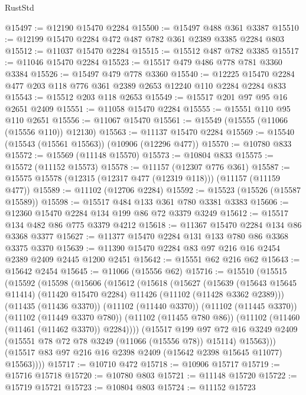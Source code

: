 \begin{lexlean}{RustStd}
\begin{coremodule}
@15497 := @12190 @15470 @2284
@15500 := @15497 @488 @361 @3387
@15510 := @12199 @15470 @2284 @472 @487 @782 @361 @2389 @3385 @2284 @803
@15512 := @11037 @15470 @2284
@15515 := @15512 @487 @782 @3385
@15517 := @11046 @15470 @2284
@15523 := @15517 @479 @486 @778 @781 @3360 @3384
@15526 := @15497 @479 @778 @3360
@15540 := @12225 @15470 @2284 @477 @203 @118 @776 @361 @2389 @2653 @12240 @110 @2284 @2284 @833
@15543 := @15512 @203 @118 @2653
@15549 := @15517 @201 @97 @95 @16 @2651 @2409
@15551 := @11058 @15470 @2284
@15555 := @15551 @110 @95 @110 @2651
@15556 := @11067 @15470
@15561 := @15549 (@15555 (@11066 (@15556 @110)) @12130)
@15563 := @11137 @15470 @2284
@15569 := @15540 (@15543 (@15561 @15563)) (@10906 (@12296 @477))
@15570 := @10780 @833
@15572 := @15569 (@11148 @15570)
@15573 := @10804 @833
@15575 := @15572 (@11152 @15573)
@15578 := @11157 (@12307 @776 @361)
@15587 := @15575 @15578 (@12315 (@12317 @477 (@12319 @118))) (@11157 (@11159 @477))
@15589 := @11102 (@12706 @2284)
@15592 := @15523 (@15526 (@15587 @15589))
@15598 := @15517 @484 @133 @361 @780 @3381 @3383
@15606 := @12360 @15470 @2284 @134 @199 @86 @72 @3379 @3249
@15612 := @15517 @134 @482 @86 @775 @3379 @4212
@15618 := @11367 @15470 @2284 @134 @86 @3368 @3377
@15627 := @11377 @15470 @2284 @131 @133 @780 @86 @3368 @3375 @3370
@15639 := @11390 @15470 @2284 @83 @97 @216 @16 @2454 @2389 @2409 @2445 @1200 @2451
@15642 := @15551 @62 @216 @62
@15643 := @15642 @2454
@15645 := @11066 (@15556 @62)
@15716 := @15510
    (@15515
      (@15592
        (@15598
          (@15606
            (@15612
              (@15618
                (@15627
                  (@15639
                    (@15643 @15645 @11414)
                    (@11420 @15470 @2284)
                    @11426
                    (@11102 (@11428 @3362 @2389)))
                  (@11435 (@11436 @3370))
                  (@11102 (@11440 @3370))
                  (@11102 (@11445 @3370))
                  (@11102 (@11449 @3370 @780))
                  (@11102 (@11455 @780 @86))
                  (@11102 (@11460 (@11461 (@11462 @3370)) @2284))))
              (@15517
                @199
                @97
                @72
                @16
                @3249
                @2409
                (@15551 @78 @72 @78 @3249 (@11066 (@15556 @78)) @15114)
                @15563)))
          (@15517 @83 @97 @216 @16 @2398 @2409 (@15642 @2398 @15645 @11077) @15563))))
@15717 := @10710 @472
@15718 := @10906 @15717
@15719 := @15716 @15718
@15720 := @10780 @803
@15721 := @11148 @15720
@15722 := @15719 @15721
@15723 := @10804 @803
@15724 := @11152 @15723

\end{coremodule}
\end{lexlean}
